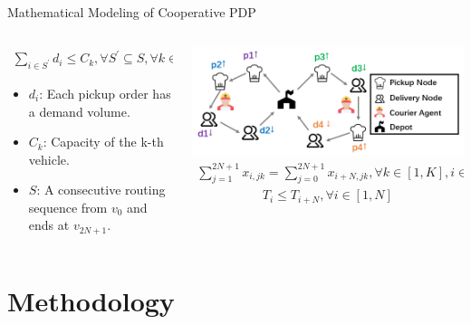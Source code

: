 \documentclass{beamer}
\begin{document}
\begin{frame}{Mathematical Modeling of Cooperative PDP}
	\centering
	\small
	\begin{columns}
		\begin{column}{0.4\textwidth}
			\begin{align}
				\sum_{i\in S^{\prime}}d_{i}\leq C_{k},\forall S^{\prime}\subseteq S,\forall k\in[1,K],
			\end{align}
			\begin{itemize}
				\small
				\item $d_i$: Each pickup order has a demand volume.
				\item $C_k$: Capacity of the k-th vehicle.
				\item $S$: A consecutive routing sequence from $v_0$ and ends at $v_{2N+1}$.
			\end{itemize}
		\end{column}
		\begin{column}{0.6\textwidth}
			\centering
			\includegraphics[width=\textwidth]{show.png}
			\begin{align}
				\sum_{j=1}^{2N+1}x_{i,jk}=\sum_{j=0}^{2N+1}x_{i+N,jk},\forall k\in[1,K], i\in[1,N],
			\end{align}
			\begin{align}
				T_{i}\leq T_{i+N},\forall i\in[1,N]
			\end{align}
		\end{column}
	\end{columns}
\end{frame}

\section{Methodology}
\end{document}
